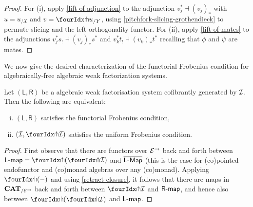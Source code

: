\documentclass[reqno,10pt,a4paper,oneside,draft]{amsart}
\newcommand{\LL}{\mathsf{L}}
\newcommand{\RR}{\mathsf{R}}
\begin{document}
{{\begin{proof} For (i), apply \cref{lift-of-adjunction} to the adjunction $v_j^* \dashv (v_j)_*$ with $u = u_{/X}$ and $v = {\liftr{u}}_{/Y}$, using \cref{pitchfork-slicing-grothendieck} to permute slicing and the left orthogonality functor. For (ii), apply \cref{lift-of-mates} to  
the adjunctions $v_j^* s_! \dashv (v_j)_* s^*$ and $v_k^* t_! \dashv (v_k)_* t^*$ recalling that $\phi$ and $\psi$ are mates.
\end{proof}




We now give the desired characterization of the functorial Frobenius condition for algebraically-free algebraic weak factorization systems.




\begin{theorem} \label{thm:frobenius-comparison}
Let $(\LL, \RR)$ be a algebraic weak factorisation system cofibrantly generated by $\cal{I}$. Then the following
are equivalent:
\begin{enumerate}[(i)] 
\item  $(\LL, \RR)$ satisfies the functorial Frobenius condition,
\item $(\cal{I}, \liftr{\cal{I}})$ satisfies the uniform Frobenius condition.
\end{enumerate}
\end{theorem}

\begin{proof} First observe that there are functors over $\cal{E}^\to$ back and forth between $\pcoalg{\LL} = \liftl{(\liftr{\cal{I}})}$ and $\overline{\pCoalg{\LL}}$ (this is the case for (co)pointed endofunctor and (co)monad algebras over any (co)monad).
Applying $\liftr{(-)}$ and using \cref{retract-closure}, it follows that there are maps in $\CAT_{/\cal{E}^\to}$ back and forth between $\liftr{\cal{I}}$ and $\palg{\RR}$, and hence also between $\liftl{(\liftr{\cal{I}})}$ and $\pcoalg{\LL}$.


\end{proof}}}
\end{document}
